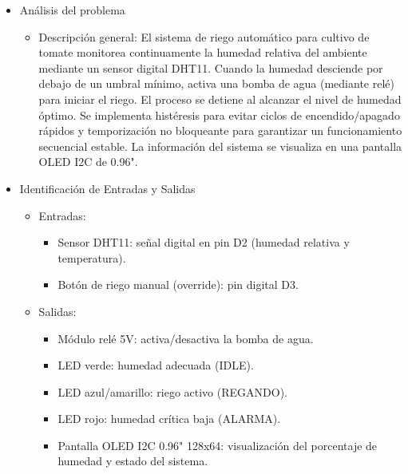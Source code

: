 \begin{itemize}
    \item Análisis del problema
        \begin{itemize}
        
            \item Descripción general:
            El sistema de riego automático para cultivo de tomate monitorea continuamente la humedad relativa del ambiente mediante un sensor digital DHT11. Cuando la humedad desciende por debajo de un umbral mínimo, activa una bomba de agua (mediante relé) para iniciar el riego. El proceso se detiene al alcanzar el nivel de humedad óptimo. Se implementa histéresis para evitar ciclos de encendido/apagado rápidos y temporización no bloqueante para garantizar un funcionamiento secuencial estable. La información del sistema se visualiza en una pantalla OLED I2C de 0.96".

        \end{itemize} 

        \item Identificación de Entradas y Salidas
        \begin{itemize}
            
            \item Entradas:
                \begin{itemize}
                    \item  Sensor DHT11: señal digital en pin D2 (humedad relativa y temperatura).

                    \item Botón de riego manual (override): pin digital D3.                  
                \end{itemize}
            
            \item Salidas:
                \begin{itemize}
                    \item Módulo relé 5V: activa/desactiva la bomba de agua.
                    \item LED verde: humedad adecuada (IDLE).    
                    \item LED azul/amarillo: riego activo (REGANDO).
                    \item LED rojo: humedad crítica baja (ALARMA).
                    \item Pantalla OLED I2C 0.96" 128x64: visualización del porcentaje de humedad y estado del sistema.
                \end{itemize}
        \end{itemize}


\end{itemize}
